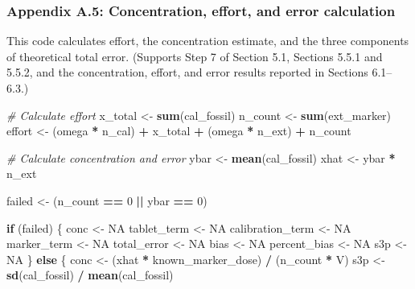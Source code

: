\documentclass[
  12pt,
]{article}
\newenvironment{Shaded}{\begin{snugshade}}{\end{snugshade}}
\newcommand{\CommentTok}[1]{\textcolor[rgb]{0.56,0.35,0.01}{\textit{#1}}}
\newcommand{\ConstantTok}[1]{\textcolor[rgb]{0.56,0.35,0.01}{#1}}
\newcommand{\ControlFlowTok}[1]{\textcolor[rgb]{0.13,0.29,0.53}{\textbf{#1}}}
\newcommand{\DecValTok}[1]{\textcolor[rgb]{0.00,0.00,0.81}{#1}}
\newcommand{\FunctionTok}[1]{\textcolor[rgb]{0.13,0.29,0.53}{\textbf{#1}}}
\newcommand{\NormalTok}[1]{#1}
\newcommand{\OtherTok}[1]{\textcolor[rgb]{0.56,0.35,0.01}{#1}}
\newcommand{\SpecialCharTok}[1]{\textcolor[rgb]{0.81,0.36,0.00}{\textbf{#1}}}
\begin{document}
\subsubsection{Appendix A.5: Concentration, effort, and error
calculation}\label{appendix-a.5-concentration-effort-and-error-calculation}

This code calculates effort, the concentration estimate, and the three
components of theoretical total error. (Supports Step 7 of Section 5.1,
Sections 5.5.1 and 5.5.2, and the concentration, effort, and error
results reported in Sections 6.1--6.3.)

\begin{Shaded}
\begin{Highlighting}[]
  \CommentTok{\# Calculate effort}
\NormalTok{  x\_total }\OtherTok{\textless{}{-}} \FunctionTok{sum}\NormalTok{(cal\_fossil)}
\NormalTok{  n\_count }\OtherTok{\textless{}{-}} \FunctionTok{sum}\NormalTok{(ext\_marker)}
\NormalTok{  effort }\OtherTok{\textless{}{-}}\NormalTok{ (omega }\SpecialCharTok{*}\NormalTok{ n\_cal) }\SpecialCharTok{+}\NormalTok{ x\_total }\SpecialCharTok{+}\NormalTok{ (omega }\SpecialCharTok{*}\NormalTok{ n\_ext) }\SpecialCharTok{+}\NormalTok{ n\_count}

  \CommentTok{\# Calculate concentration and error}
\NormalTok{  ybar }\OtherTok{\textless{}{-}} \FunctionTok{mean}\NormalTok{(cal\_fossil)}
\NormalTok{  xhat }\OtherTok{\textless{}{-}}\NormalTok{ ybar }\SpecialCharTok{*}\NormalTok{ n\_ext}

\NormalTok{  failed }\OtherTok{\textless{}{-}}\NormalTok{ (n\_count }\SpecialCharTok{==} \DecValTok{0} \SpecialCharTok{||}\NormalTok{ ybar }\SpecialCharTok{==} \DecValTok{0}\NormalTok{)}

  \ControlFlowTok{if}\NormalTok{ (failed) \{}
\NormalTok{    conc }\OtherTok{\textless{}{-}} \ConstantTok{NA}
\NormalTok{    tablet\_term }\OtherTok{\textless{}{-}} \ConstantTok{NA}
\NormalTok{    calibration\_term }\OtherTok{\textless{}{-}} \ConstantTok{NA}
\NormalTok{    marker\_term }\OtherTok{\textless{}{-}} \ConstantTok{NA}
\NormalTok{    total\_error }\OtherTok{\textless{}{-}} \ConstantTok{NA}
\NormalTok{    bias }\OtherTok{\textless{}{-}} \ConstantTok{NA}
\NormalTok{    percent\_bias }\OtherTok{\textless{}{-}} \ConstantTok{NA}
\NormalTok{    s3p }\OtherTok{\textless{}{-}} \ConstantTok{NA}
\NormalTok{  \} }\ControlFlowTok{else}\NormalTok{ \{}
\NormalTok{    conc }\OtherTok{\textless{}{-}}\NormalTok{ (xhat }\SpecialCharTok{*}\NormalTok{ known\_marker\_dose) }\SpecialCharTok{/}\NormalTok{ (n\_count }\SpecialCharTok{*}\NormalTok{ V)}
\NormalTok{    s3p }\OtherTok{\textless{}{-}} \FunctionTok{sd}\NormalTok{(cal\_fossil) }\SpecialCharTok{/} \FunctionTok{mean}\NormalTok{(cal\_fossil)}


\end{Highlighting}
\end{Shaded}
\end{document}
